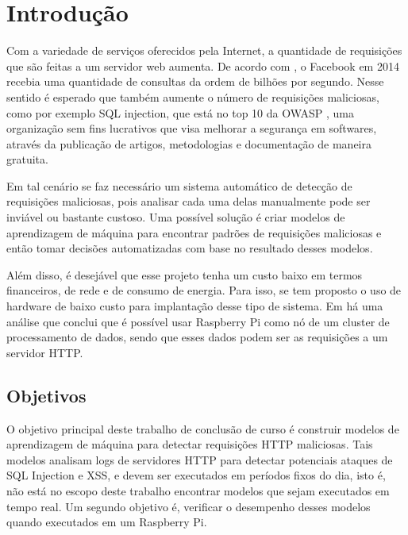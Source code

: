 
\chapter{Introdução}
\label{cap:introducao}

Com a variedade de serviços oferecidos pela Internet, a quantidade de requisições
que são feitas a um servidor web aumenta. De acordo com \cite{facebook:topProblems}, o Facebook em 2014 recebia
uma quantidade de consultas da ordem de bilhões por segundo. Nesse sentido é esperado que
também aumente o número de requisições maliciosas, como por exemplo SQL injection, que está 
no top 10 da OWASP \citep{owasp:top10}, uma organização sem fins lucrativos que visa melhorar a segurança em 
softwares, através da publicação de artigos, metodologias e documentação de maneira gratuita.

Em tal cenário se faz necessário um sistema automático de detecção de requisições maliciosas, pois analisar cada
uma delas manualmente pode ser inviável ou bastante custoso. Uma possível solução é criar modelos de aprendizagem
de máquina para encontrar padrões de requisições maliciosas e então tomar decisões automatizadas com base no
resultado desses modelos.

Além disso, é desejável que esse projeto tenha um custo baixo em termos financeiros, de rede e
de consumo de energia. Para isso, se tem proposto o uso de hardware de baixo custo para implantação 
desse tipo de sistema. Em \cite{sbrc_estendido:lucas} há uma análise que conclui que é possível usar Raspberry Pi como nó de
um cluster de processamento de dados, sendo que esses dados podem ser as requisições a um servidor HTTP.

\section{Objetivos}

O objetivo principal deste trabalho de conclusão de curso é construir modelos de aprendizagem de máquina para 
detectar requisições HTTP maliciosas. Tais modelos analisam logs de servidores HTTP para detectar 
potenciais ataques de SQL Injection e XSS, e devem ser executados em períodos fixos do dia, isto é, 
não está no escopo deste trabalho encontrar modelos que sejam executados em tempo real. Um segundo objetivo é, 
verificar o desempenho desses modelos quando executados em um Raspberry Pi. 

